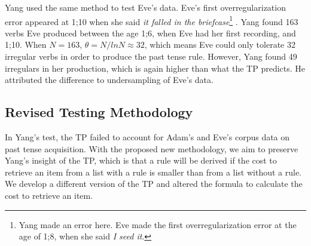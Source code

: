 Yang used the same method to test Eve's data. Eve's first overregularization error appeared at 1;10 when she said \textit{it falled in the briefcase}\footnote{Yang made an error here. Eve made the first overregularization error at the age of 1;8, when she said \textit{I seed it}.} \citep{brown19731}. Yang found 163 verbs Eve produced between the age 1;6, when Eve had her first recording, and 1;10. When $N = 163$, $\theta = N/lnN \approx 32$, which means Eve could only tolerate 32 irregular verbs in order to produce the past tense rule. However, Yang found 49 irregulars in her production, which is again higher than what the TP predicts. He attributed the difference to undersampling of Eve's data.  

\subsection{Revised Testing Methodology}
In Yang's test, the TP failed to account for Adam's and Eve's corpus data on past tense acquisition. With the proposed new methodology, we aim to preserve Yang's insight of the TP, which is that a rule will be derived if the cost to retrieve an item from a list with a rule is smaller than from a list without a rule. We develop a different version of the TP and altered the formula to calculate the cost to retrieve an item. 

